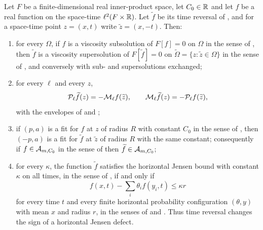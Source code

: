 \begin{lemma}
Let $F$ be a finite-dimensional real inner-product space, let $C_0\in\mathbb{R}$ and let
$f$ be a real function on the space-time $\ell^2(F\times\mathbb{R})$. Let
$\widetilde f$ be its time reversal of , and for a space-time
point $z=(x,t)$ write $\widetilde z=(x,-t)$. Then:
\begin{enumerate}
\item for every $\Omega$, if $f$ is a viscosity subsolution of $F[f]=0$ on
$\Omega$ in the sense of , then $\widetilde f$ is a
viscosity supersolution of $F[\widetilde f]=0$ on
$\widetilde\Omega=\{z:\widetilde z\in\Omega\}$ in the sense of
, and conversely with sub- and supersolutions
exchanged;
\item for every $\ell$ and every $z$,
\[
  \mathcal{P}_\ell\widetilde f(z)=-\mathcal{M}_\ell f(\widetilde z),
  \qquad
  \mathcal{M}_\ell\widetilde f(z)=-\mathcal{P}_\ell f(\widetilde z),
\]
with the envelopes of  and ;
\item if $(p,a)$ is a fit for $f$ at $z$ of radius $R$ with constant $C_0$ in the
sense of , then $(-p,a)$ is a fit for $\widetilde f$ at
$\widetilde z$ of radius $R$ with the same constant; consequently if
$f\in\mathcal{A}_{m,C_0}$ in the sense of  then
$\widetilde f\in\mathcal{A}_{m,C_0}$;
\item for every $\kappa$, the function $\widetilde f$ satisfies the horizontal
Jensen bound with constant $\kappa$ on all times, in the sense of
, if and only if
\[
  f(x,t)-\sum_i\theta_if(y_i,t)\le\kappa r
\]
for every time $t$ and every finite horizontal probability configuration
$(\theta,y)$ with mean $x$ and radius $r$, in the senses of
 and . Thus time reversal changes the
sign of a horizontal Jensen defect.
\end{enumerate}
\end{lemma}

